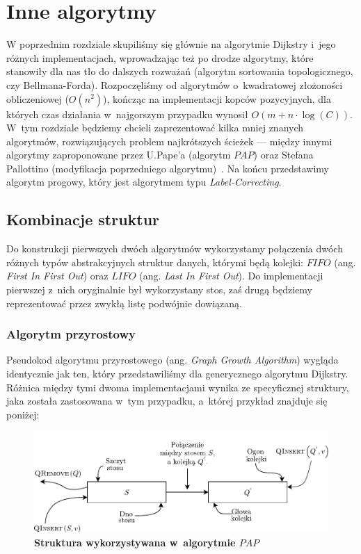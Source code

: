 \chapter{Inne algorytmy}

W poprzednim rozdziale skupiliśmy się głównie na algorytmie Dijkstry i~jego różnych implementacjach, wprowadzając też po drodze algorytmy, które stanowiły dla nas tło do dalszych rozważań (algorytm sortowania topologicznego, czy Bellmana-Forda). Rozpoczęliśmy od algorytmów o~kwadratowej złożoności obliczeniowej ($O \left( n^{2} \right)$), kończąc na implementacji kopców pozycyjnych, dla których czas działania w~najgorszym przypadku wynosił $O \left( m + n \cdot \log \left( C \right) \right) $. W~tym rozdziale będziemy chcieli zaprezentować kilka mniej znanych algorytmów, rozwiązujących problem najkrótszych ścieżek --- między innymi algorytmy zaproponowane przez U.Pape'a (algorytm $PAP$) oraz Stefana Pallottino (modyfikacja poprzedniego algorytmu)~\cite[$4.$]{GIDA}. Na końcu przedstawimy algorytm progowy, który jest algorytmem typu \textit{Label-Correcting}.

\section{Kombinacje struktur}

Do konstrukcji pierwszych dwóch algorytmów wykorzystamy połączenia dwóch różnych typów abstrakcyjnych struktur danych, którymi będą kolejki: $FIFO$ (ang. \textit{First In First Out}) oraz $LIFO$ (ang. \textit{Last In First Out}). Do implementacji pierwszej z~nich oryginalnie był wykorzystany stos, zaś drugą będziemy reprezentować przez zwykłą listę podwójnie dowiązaną.

\subsection{Algorytm przyrostowy}

Pseudokod algorytmu przyrostowego (ang. \textit{Graph Growth Algorithm}) wygląda identycznie jak ten, który przedstawiliśmy dla generycznego algorytmu Dijkstry. Różnica między tymi dwoma implementacjami wynika ze specyficznej struktury, jaka została zastosowana w~tym przypadku, a~której przykład znajduje się poniżej:


\begin{figure}[!htbp]
	\centering
	\includegraphics[width=\textwidth]{Chapter_III/GRAPH-GROWTH-1Q-Other/a.pdf}
	\caption{\textbf{Struktura wykorzystywana w~algorytmie $PAP$}} \label{fig:examplePAPStructure}
\end{figure}

